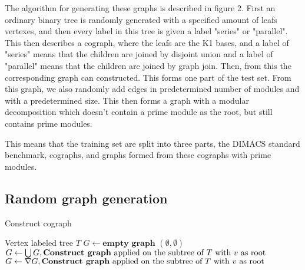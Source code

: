 \documentclass{amsart}
\begin{document}
The algorithm for generating these graphs is described in figure 2. First an
ordinary binary tree is randomly generated with a specified amount of leafs
vertexes, and then every label in this tree is given a label "series" or
"parallel".  This then describes a cograph, where the leafs are the K1 bases,
and a label of "series" means that the children are joined by disjoint union and a label
of "parallel" means that the children are joined by graph join. Then, from this
the corresponding graph can constructed. This forms one part of the test set.
From this graph, we also randomly add edges in predetermined number of modules
and with a predetermined size. This then forms a graph with a modular
decomposition which doesn't contain a prime module as the root, but still
contains prime modules.

This means that the training set are split into three parts, the DIMACS standard
benchmark, cographs, and graphs formed from these cographs with prime modules.


\subsection{Random graph generation}

\begin{algorithm}[H]
    \caption{Construct cograph}
    \begin{algorithmic}[1]
        \REQUIRE Vertex labeled tree $T$
        \ENDIF
        \STATE $G \leftarrow \textbf{empty graph $(\emptyset,\emptyset)$}$
                \STATE $G \leftarrow \bigcup G, \text{\textbf{Construct graph} applied
                on the subtree of $T$ with $v$ as root} $
                \STATE $G \leftarrow \nabla G, \text{\textbf{Construct graph} applied
                on the subtree of $T$ with $v$ as root}$
            \ENDIF
        \ENDFOR
    \end{algorithmic}
\end{algorithm}
\end{document}
